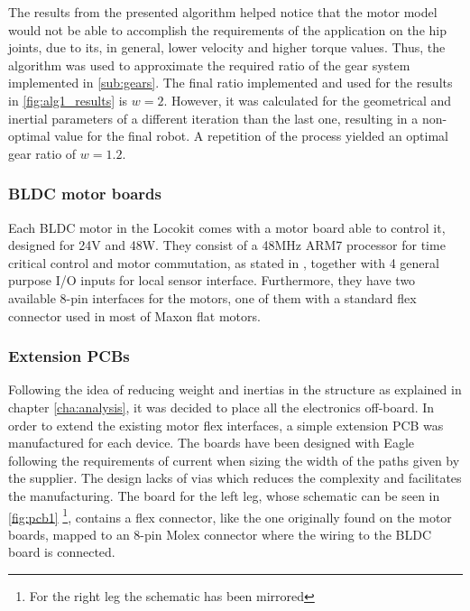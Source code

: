 The results from the presented algorithm helped notice that the motor model would not be able to accomplish the requirements of the application on the hip joints, due to its, in general, lower velocity and higher torque values.
Thus, the algorithm was used to approximate the required ratio of the gear system implemented in \ref{sub:gears}.
The final ratio implemented and used for the results in \ref{fig:alg1_results} is $w=2$. 
However, it was calculated for the geometrical and inertial parameters of a different iteration than the last one, resulting in a non-optimal value for the final robot.
A repetition of the process yielded an optimal gear ratio of $w=1.2$.

















\subsubsection{BLDC motor boards} %
\label{ssub:bldc_motor_boards}
Each BLDC motor in the Locokit comes with a motor board able to control it, designed for 24V and 48W.
They consist of a 48MHz ARM7 processor for time critical control and motor commutation, as stated in \cite{locokit-electronics}, together with 4 general purpose I/O inputs for local sensor interface.
Furthermore, they have two available 8-pin interfaces for the motors, one of them with a standard flex connector used in most of Maxon flat motors.


\subsubsection{Extension PCBs} %
\label{ssub:extension_pcbs}
Following the idea of reducing weight and inertias in the structure as explained in chapter \ref{cha:analysis}, it was decided to place all the electronics off-board.
In order to extend the existing motor flex interfaces, a simple extension PCB was manufactured for each device.
The boards have been designed with Eagle following the requirements of current when sizing the width of the paths given by the supplier.
The design lacks of vias which reduces the complexity and facilitates the manufacturing.
The board for the left leg, whose schematic can be seen in \ref{fig:pcb1} \footnote{For the right leg the schematic has been mirrored}, contains a flex connector, like the one originally found on the motor boards, mapped to an 8-pin Molex connector where the wiring to the BLDC board is connected.

